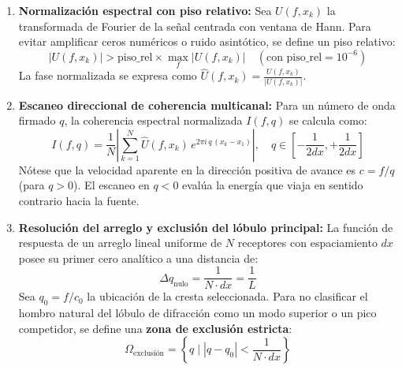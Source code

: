 \documentclass[11pt,a4paper]{article}
\begin{document}
\begin{enumerate}
    \item \textbf{Normalización espectral con piso relativo:}
    Sea $U(f, x_k)$ la transformada de Fourier de la señal centrada con ventana de Hann. Para evitar amplificar ceros numéricos o ruido asintótico, se define un piso relativo:
    \begin{equation}
        |U(f, x_k)| > \text{piso\_rel} \times \max_f |U(f, x_k)| \quad (\text{con piso\_rel} = 10^{-6})
    \end{equation}
    La fase normalizada se expresa como $\hat{U}(f, x_k) = \frac{U(f, x_k)}{|U(f, x_k)|}$.

    \item \textbf{Escaneo direccional de coherencia multicanal:}
    Para un número de onda firmado $q$, la coherencia espectral normalizada $I(f, q)$ se calcula como:
    \begin{equation}
        I(f, q) = \frac{1}{N} \left| \sum_{k=1}^{N} \hat{U}(f, x_k) \, e^{2\pi i \, q \, (x_k - x_1)} \right|, \quad q \in \left[ -\frac{1}{2dx}, +\frac{1}{2dx} \right]
    \end{equation}
    Nótese que la velocidad aparente en la dirección positiva de avance es $c = f / q$ (para $q > 0$). El escaneo en $q < 0$ evalúa la energía que viaja en sentido contrario hacia la fuente.

    \item \textbf{Resolución del arreglo y exclusión del lóbulo principal:}
    La función de respuesta de un arreglo lineal uniforme de $N$ receptores con espaciamiento $dx$ posee su primer cero analítico a una distancia de:
    \begin{equation}
        \Delta q_{\text{nulo}} = \frac{1}{N \cdot dx} = \frac{1}{L}
    \end{equation}
    Sea $q_0 = f / c_0$ la ubicación de la cresta seleccionada. Para no clasificar el hombro natural del lóbulo de difracción como un modo superior o un pico competidor, se define una \textbf{zona de exclusión estricta}:
    \begin{equation}
        \Omega_{\text{exclusión}} = \left\{ q \;\Big|\; |q - q_0| < \frac{1}{N \cdot dx} \right\}
    \end{equation}


\end{enumerate}
\end{document}
